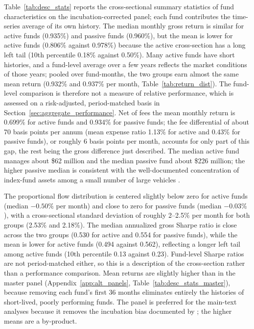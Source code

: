 \documentclass[12pt, oneside]{report}
\begin{document}


Table~\ref{tab:desc_stats} reports the cross-sectional summary statistics
of fund characteristics on the incubation-corrected panel; each fund
contributes the time-series average of its own history. The median
monthly gross return is similar for active funds (0.935\%) and passive
funds (0.960\%), but the mean is lower for active funds (0.806\% against
0.978\%) because the active cross-section has a long left tail (10th
percentile 0.18\% against 0.50\%). Many active funds have short
histories, and a fund-level average over a few years reflects the market
conditions of those years; pooled over fund-months, the two groups earn
almost the same mean return (0.932\% and 0.937\% per month,
Table~\ref{tab:return_dist}). The fund-level comparison is therefore not
a measure of relative performance, which is assessed on a risk-adjusted,
period-matched basis in Section~\ref{sec:aggregate_performance}. Net of
fees the mean monthly return is 0.699\% for active funds and 0.934\% for
passive funds; the fee differential of about 70 basis points per annum
(mean expense ratio 1.13\% for active and 0.43\% for passive funds), or
roughly 6 basis points per month, accounts for only part of this gap, the
rest being the gross difference just described. The median active fund manages about \$62 million and the
median passive fund about \$226 million; the higher passive median is
consistent with the well-documented concentration of index-fund assets
among a small number of large vehicles \parencite{ICI2025}.

The proportional flow distribution is centered slightly below zero for
active funds (median $-0.50\%$ per month) and close to zero for passive funds
(median $-0.03\%$), with a cross-sectional standard deviation of roughly
2--2.5\% per month for both groups (2.53\% and 2.18\%). The median
annualized gross Sharpe ratio is close across the two groups (0.530 for
active and 0.554 for passive funds), while the mean is lower for active
funds (0.494 against 0.562), reflecting a longer left tail among active
funds (10th percentile 0.13 against 0.23). Fund-level Sharpe ratios are
not period-matched either, so this is a description of the cross-section
rather than a performance comparison. Mean returns are slightly higher than in the master panel
(Appendix~\ref{app:alt_panels}, Table~\ref{tab:desc_stats_master}),
because removing each fund's first 36 months eliminates entirely the
histories of short-lived, poorly performing funds. The panel is
preferred for the main-text analyses because it removes the incubation
bias documented by \textcite{Evans2010}; the higher means are a
by-product.
\end{document}
